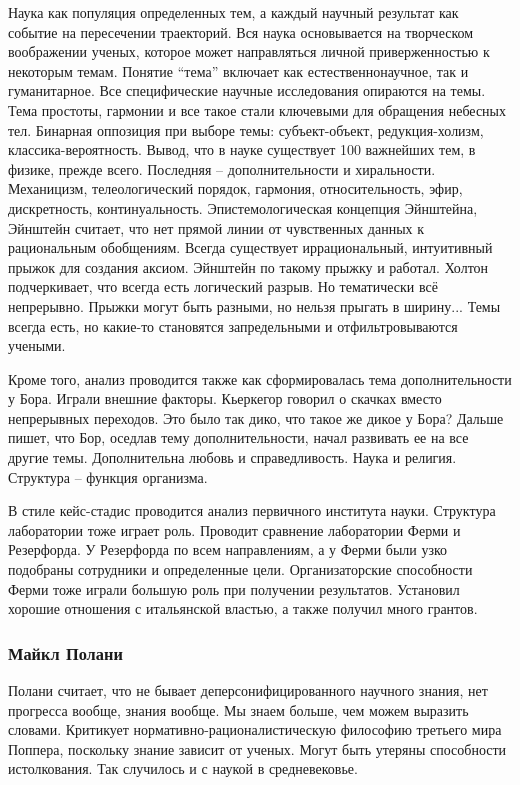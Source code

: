 \documentclass[a4paper, 12pt]{article}
\begin{document}
Наука как популяция определенных тем, а каждый научный результат как 
событие на пересечении траекторий. Вся наука основывается на творческом 
воображении ученых, которое может направляться личной приверженностью 
к некоторым темам. Понятие ``тема'' включает как естественнонаучное, так 
и гуманитарное. Все специфические научные исследования опираются на 
темы. Тема простоты, гармонии и все такое стали ключевыми для обращения 
небесных тел. Бинарная оппозиция при выборе темы: субъект-объект, 
редукция-холизм, классика-вероятность. Вывод, что в науке существует 100 
важнейших тем, в физике, прежде всего. Последняя -- дополнительности 
и хиральности. Механицизм, телеологический порядок, гармония, 
относительность, эфир, дискретность, континуальность. Эпистемологическая 
концепция Эйнштейна, Эйнштейн считает, что нет прямой линии от 
чувственных данных к рациональным обобщениям. Всегда существует 
иррациональный, интуитивный прыжок для создания аксиом. Эйнштейн по 
такому прыжку и работал. Холтон подчеркивает, что всегда есть логический 
разрыв. Но тематически всё непрерывно. Прыжки могут быть разными, но 
нельзя прыгать в ширину... Темы всегда есть, но какие-то становятся 
запредельными и отфильтровываются учеными.

Кроме того, анализ проводится также как сформировалась тема 
дополнительности у Бора. Играли внешние факторы. Кьеркегор говорил 
о скачках вместо непрерывных переходов. Это было так дико, что такое же 
дикое у Бора? Дальше пишет, что Бор, оседлав тему дополнительности, 
начал развивать ее на все другие темы. Дополнительна любовь 
и справедливость. Наука и религия. Структура -- функция организма.

В стиле кейс-стадис проводится анализ первичного института науки. 
Структура лаборатории тоже играет роль. Проводит сравнение лаборатории 
Ферми и Резерфорда. У Резерфорда по всем направлениям, а у Ферми были 
узко подобраны сотрудники и определенные цели. Организаторские 
способности Ферми тоже играли большую роль при получении результатов. 
Установил хорошие отношения с итальянской властью, а также получил много 
грантов.


\subsubsection{Майкл Полани}

Полани считает, что не бывает деперсонифицированного научного знания, 
нет прогресса вообще, знания вообще. Мы знаем больше, чем можем выразить 
словами. Критикует нормативно-рационалистическую философию третьего мира 
Поппера, поскольку знание зависит от ученых. Могут быть утеряны 
способности истолкования. Так случилось и с наукой в средневековье.
\end{document}
